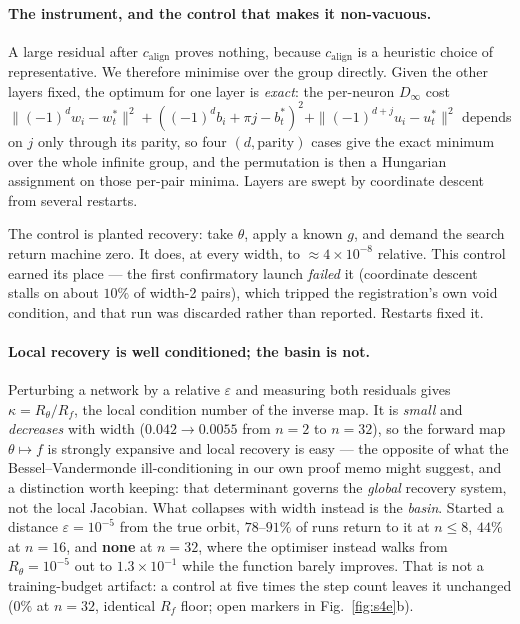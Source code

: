 \documentclass[10pt,letterpaper]{article}
\theoremstyle{definition}
\newcommand{\Dinf}{D_\infty}
\newcommand{\calign}{c_{\mathrm{align}}}
\begin{document}
\paragraph{The instrument, and the control that makes it non-vacuous.} A large residual after
$\calign$ proves nothing, because $\calign$ is a heuristic choice of representative. We therefore
minimise over the group directly. Given the other layers fixed, the optimum for one layer is
\emph{exact}: the per-neuron $\Dinf$ cost
$\|(-1)^dw_i - w^*_t\|^2 + ((-1)^db_i + \pi j - b^*_t)^2 + \|(-1)^{d+j}u_i - u^*_t\|^2$
depends on $j$ only through its parity, so four $(d,\text{parity})$ cases give the exact minimum
over the whole infinite group, and the permutation is then a Hungarian assignment on those
per-pair minima. Layers are swept by coordinate descent from several restarts.

The control is planted recovery: take $\theta$, apply a known $g$, and demand the search return
machine zero. It does, at every width, to $\approx4\times10^{-8}$ relative. This control earned its
place --- the first confirmatory launch \emph{failed} it (coordinate descent stalls on about
$10\%$ of width-2 pairs), which tripped the registration's own void condition, and that run was
discarded rather than reported. Restarts fixed it.



\paragraph{Local recovery is well conditioned; the basin is not.} Perturbing a network by a
relative $\varepsilon$ and measuring both residuals gives $\kappa = R_\theta/R_f$, the local
condition number of the inverse map. It is \emph{small} and \emph{decreases} with width
($0.042 \to 0.0055$ from $n=2$ to $n=32$), so the forward map $\theta\mapsto f$ is strongly
expansive and local recovery is easy --- the opposite of what the Bessel--Vandermonde
ill-conditioning in our own proof memo might suggest, and a distinction worth keeping: that
determinant governs the \emph{global} recovery system, not the local Jacobian. What collapses with
width instead is the \emph{basin}. Started a distance $\varepsilon=10^{-5}$ from the true orbit,
$78$--$91\%$ of runs return to it at $n\le8$, $44\%$ at $n=16$, and \textbf{none} at $n=32$, where
the optimiser instead walks from $R_\theta = 10^{-5}$ out to $1.3\times10^{-1}$ while the function
barely improves. That is not a training-budget artifact: a control at five times the step count
leaves it unchanged ($0\%$ at $n=32$, identical $R_f$ floor; open markers in
Fig.~\ref{fig:s4e}b).
\end{document}
